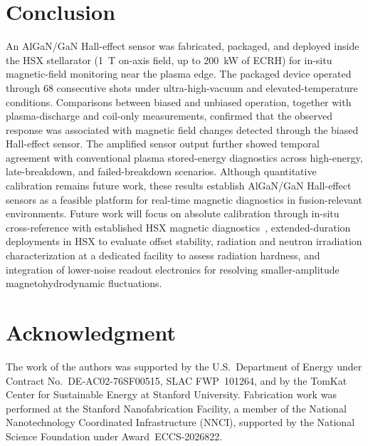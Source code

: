 \documentclass{IEEE_lsens}
\begin{document}
\section{Conclusion}
An AlGaN/GaN Hall-effect sensor was fabricated, packaged, and deployed inside the HSX stellarator (\SI{1}{\tesla} on-axis field, up to \SI{200}{\kilo\watt} of ECRH) for in-situ magnetic-field monitoring near the plasma edge. The packaged device operated through 68 consecutive shots under ultra-high-vacuum and elevated-temperature conditions. Comparisons between biased and unbiased operation, together with plasma-discharge and coil-only measurements, confirmed that the observed response was associated with magnetic field changes detected through the biased Hall-effect sensor. The amplified sensor output further showed temporal agreement with conventional plasma stored-energy diagnostics across high-energy, late-breakdown, and failed-breakdown scenarios. Although quantitative calibration remains future work, these results establish AlGaN/GaN Hall-effect sensors as a feasible platform for real-time magnetic diagnostics in fusion-relevant environments. Future work will focus on absolute calibration through in-situ cross-reference with established HSX magnetic diagnostics~\cite{ref17}, extended-duration deployments in HSX to evaluate offset stability, radiation and neutron irradiation characterization at a dedicated facility to assess radiation hardness, and integration of lower-noise readout electronics for resolving smaller-amplitude magnetohydrodynamic fluctuations.


\section*{Acknowledgment}
\scriptsize
The work of the authors was supported by the U.S.\ Department of Energy under Contract No.~DE-AC02-76SF00515, SLAC FWP~101264, and by the TomKat Center for Sustainable Energy at Stanford University. Fabrication work was performed at the Stanford Nanofabrication Facility, a member of the National Nanotechnology Coordinated Infrastructure (NNCI), supported by the National Science Foundation under Award~ECCS-2026822.
\normalsize
\end{document}
